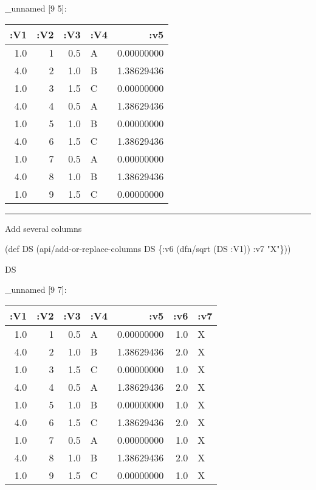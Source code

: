 \documentclass[]{article}
\newenvironment{Shaded}{\begin{snugshade}}{\end{snugshade}}
\newcommand{\StringTok}[1]{\textcolor[rgb]{0.31,0.60,0.02}{#1}}
\newcommand{\FunctionTok}[1]{\textcolor[rgb]{0.00,0.00,0.00}{#1}}
\newcommand{\BuiltInTok}[1]{#1}
\newcommand{\AttributeTok}[1]{\textcolor[rgb]{0.77,0.63,0.00}{#1}}
\newcommand{\NormalTok}[1]{#1}
\begin{document}
\_unnamed {[}9 5{]}:

\begin{longtable}[]{@{}rrrlr@{}}
\toprule
:V1 & :V2 & :V3 & :V4 & :v5\tabularnewline
\midrule
\endhead
1.0 & 1 & 0.5 & A & 0.00000000\tabularnewline
4.0 & 2 & 1.0 & B & 1.38629436\tabularnewline
1.0 & 3 & 1.5 & C & 0.00000000\tabularnewline
4.0 & 4 & 0.5 & A & 1.38629436\tabularnewline
1.0 & 5 & 1.0 & B & 0.00000000\tabularnewline
4.0 & 6 & 1.5 & C & 1.38629436\tabularnewline
1.0 & 7 & 0.5 & A & 0.00000000\tabularnewline
4.0 & 8 & 1.0 & B & 1.38629436\tabularnewline
1.0 & 9 & 1.5 & C & 0.00000000\tabularnewline
\bottomrule
\end{longtable}

\begin{center}\rule{0.5\linewidth}{0.5pt}\end{center}

Add several columns

\begin{Shaded}
\begin{Highlighting}[]
\NormalTok{(}\BuiltInTok{def}\FunctionTok{ DS }\NormalTok{(api/add-or-replace-columns DS \{}\AttributeTok{:v6}\NormalTok{ (dfn/sqrt (DS }\AttributeTok{:V1}\NormalTok{))}
                                       \AttributeTok{:v7} \StringTok{"X"}\NormalTok{\}))}
\end{Highlighting}
\end{Shaded}

\begin{Shaded}
\begin{Highlighting}[]
\NormalTok{DS}
\end{Highlighting}
\end{Shaded}

\_unnamed {[}9 7{]}:

\begin{longtable}[]{@{}rrrlrrl@{}}
\toprule
:V1 & :V2 & :V3 & :V4 & :v5 & :v6 & :v7\tabularnewline
\midrule
\endhead
1.0 & 1 & 0.5 & A & 0.00000000 & 1.0 & X\tabularnewline
4.0 & 2 & 1.0 & B & 1.38629436 & 2.0 & X\tabularnewline
1.0 & 3 & 1.5 & C & 0.00000000 & 1.0 & X\tabularnewline
4.0 & 4 & 0.5 & A & 1.38629436 & 2.0 & X\tabularnewline
1.0 & 5 & 1.0 & B & 0.00000000 & 1.0 & X\tabularnewline
4.0 & 6 & 1.5 & C & 1.38629436 & 2.0 & X\tabularnewline
1.0 & 7 & 0.5 & A & 0.00000000 & 1.0 & X\tabularnewline
4.0 & 8 & 1.0 & B & 1.38629436 & 2.0 & X\tabularnewline
1.0 & 9 & 1.5 & C & 0.00000000 & 1.0 & X\tabularnewline
\bottomrule
\end{longtable}
\end{document}
